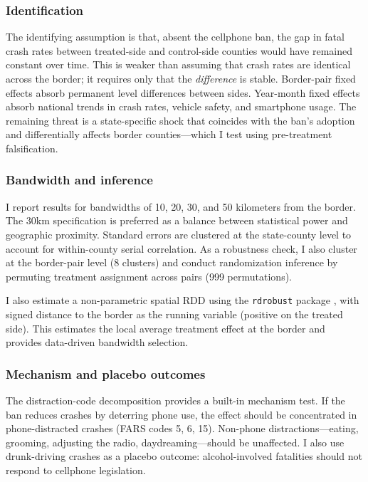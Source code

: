 \documentclass[12pt]{article}
\begin{document}
\subsubsection*{Identification} The identifying assumption is that, absent the cellphone ban, the gap in fatal crash rates between treated-side and control-side counties would have remained constant over time. This is weaker than assuming that crash rates are identical across the border; it requires only that the \textit{difference} is stable. Border-pair fixed effects absorb permanent level differences between sides. Year-month fixed effects absorb national trends in crash rates, vehicle safety, and smartphone usage. The remaining threat is a state-specific shock that coincides with the ban's adoption and differentially affects border counties---which I test using pre-treatment falsification.

\subsubsection*{Bandwidth and inference} I report results for bandwidths of 10, 20, 30, and 50 kilometers from the border. The 30km specification is preferred as a balance between statistical power and geographic proximity. Standard errors are clustered at the state-county level to account for within-county serial correlation. As a robustness check, I also cluster at the border-pair level (8 clusters) and conduct randomization inference by permuting treatment assignment across pairs (999 permutations).

I also estimate a non-parametric spatial RDD using the \texttt{rdrobust} package \citep{Cattaneo2020}, with signed distance to the border as the running variable (positive on the treated side). This estimates the local average treatment effect at the border and provides data-driven bandwidth selection.

\subsubsection*{Mechanism and placebo outcomes} The distraction-code decomposition provides a built-in mechanism test. If the ban reduces crashes by deterring phone use, the effect should be concentrated in phone-distracted crashes (FARS codes 5, 6, 15). Non-phone distractions---eating, grooming, adjusting the radio, daydreaming---should be unaffected. I also use drunk-driving crashes as a placebo outcome: alcohol-involved fatalities should not respond to cellphone legislation.
\end{document}
